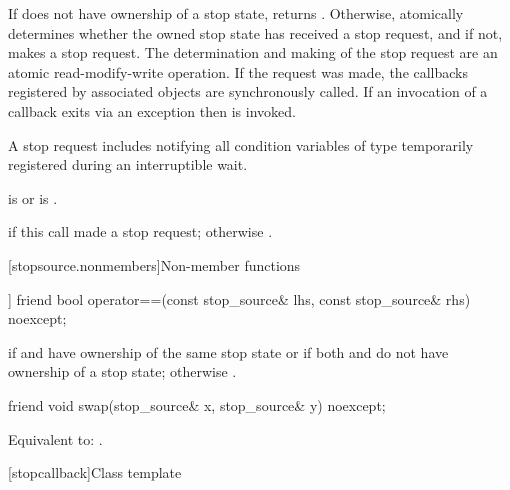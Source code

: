 \begin{itemdescr}
\pnum
\effects
If  does not have ownership of a stop state, returns .
Otherwise, atomically determines whether the owned stop state
has received a stop request,
and if not, makes a stop request.
The determination and making of the stop request are an
atomic read-modify-write operation.
If the request was made,
the callbacks registered by associated  objects
are synchronously called.
If an invocation of a callback exits via an exception
then  is invoked.
\begin{note}
A stop request includes notifying all condition variables
of type 
temporarily registered during
an interruptible wait.
\end{note}

\pnum
\ensures
{} is 
or  is .

\pnum
\returns
{} if this call made a stop request;
otherwise .
\end{itemdescr}

[stopsource.nonmembers]{Non-member functions}

%
\begin{itemdecl}
[[nodiscard]] friend bool
  operator==(const stop_source& lhs, const stop_source& rhs) noexcept;
\end{itemdecl}

\begin{itemdescr}
\pnum
\returns
{} if  and  have ownership
of the same stop state
or if both  and  do not have ownership of a stop state;
otherwise .
\end{itemdescr}

%
\begin{itemdecl}
friend void swap(stop_source& x, stop_source& y) noexcept;
\end{itemdecl}

\begin{itemdescr}
\pnum
\effects
Equivalent to: .
\end{itemdescr}

[stopcallback]{Class template }%
%

